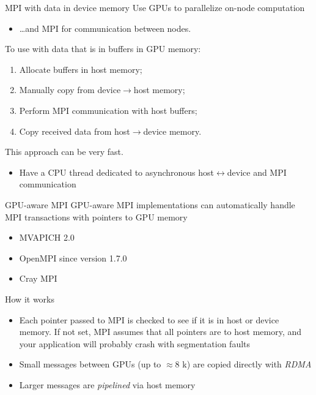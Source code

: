 \documentclass[aspectratio=43]{beamer}
\begin{document}
\begin{frame}[fragile]{MPI with data in device memory}
    Use GPUs to parallelize on-node computation
    \begin{itemize}
        \item \dots and MPI for communication between nodes.
    \end{itemize}
    To use with data that is in buffers in GPU memory:
    \begin{enumerate}
        \item Allocate buffers in host memory;
        \item Manually copy from device$\rightarrow$host memory;
        \item Perform MPI communication with host buffers;
        \item Copy received data from host$\rightarrow$device memory.
    \end{enumerate}
    This approach can be very fast.
    \begin{itemize}
        \item Have a CPU thread dedicated to asynchronous host$\leftrightarrow$device and MPI communication
    \end{itemize}
\end{frame}

\begin{frame}[fragile]{GPU-aware MPI}
        GPU-aware MPI implementations can automatically handle MPI transactions with pointers to GPU memory
        \begin{itemize}
            \item MVAPICH 2.0
            \item OpenMPI since version 1.7.0
            \item Cray MPI
        \end{itemize}

    \begin{info}{How it works}
        \begin{itemize}
            \item Each pointer passed to MPI is checked to see if it is in host or device memory.
            If not set, MPI assumes that all pointers are to host memory, and your application will probably crash with segmentation faults
            \item Small messages between GPUs (up to $\approx$8 k) are copied directly with \emph{RDMA}
            \item Larger messages are \emph{pipelined} via host memory
        \end{itemize}
    \end{info}

\end{frame}
\end{document}
